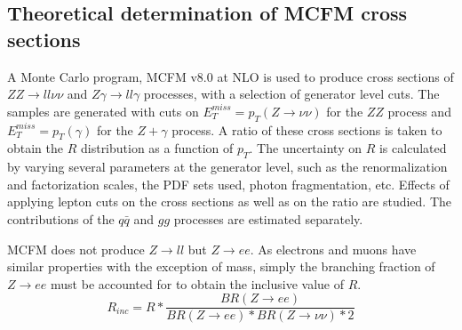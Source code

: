 \documentclass[11pt,a4paper,final]{report}
\newcommand{\ZZ}{$ZZ\to ll\nu\nu$ }
\newcommand{\Zgam}{$Z\gamma\to ll\gamma$ }
\begin{document}
\subsection*{Theoretical determination of MCFM cross sections}
A Monte Carlo program, MCFM v8.0 \cite{MCFM} at NLO is used to produce cross sections of \ZZ and \Zgam processes, with a selection of generator level cuts. The samples are generated with cuts on $E_T^{miss} = p_T(Z\to \nu\nu)$ for the $ZZ$ process and $E_T^{miss} = p_T(\gamma)$ for the $Z+\gamma$ process. A ratio of these cross sections is taken to obtain the $R$ distribution as a function of $p_T$. The uncertainty on $R$ is calculated by varying several parameters at the generator level, such as the renormalization and factorization scales, the PDF sets used, photon fragmentation, etc. Effects of applying lepton cuts on the cross sections as well as on the ratio are studied. The contributions of the $q \bar{q}$ and $gg$ processes are estimated separately.

MCFM does not produce $Z\rightarrow ll$ but $Z\rightarrow ee$. As electrons and muons have similar properties with the exception of mass, simply the branching fraction of $Z\rightarrow ee$ must be accounted for to obtain the inclusive value of $R$.
\begin{equation}\label{eq:R_inc}
	R_{inc} = R * \frac{BR(Z\rightarrow ee)}{BR(Z \rightarrow ee)*BR(Z\rightarrow \nu\nu)*2}
\end{equation}
\end{document}
